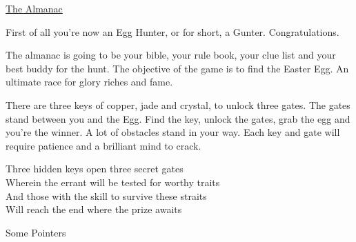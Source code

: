 \documentclass[a4paper]{article}
\newcommand{\row}{\vspace{5mm}}
\begin{document}
\begin{center}
\Large{\underline{The Almanac}}
\end{center}

\newenvironment{noSepEnumerate}
{ \begin{enumerate}
    \setlength{\itemsep}{1pt}
    \setlength{\parskip}{0pt}
    \setlength{\parsep}{0pt}}
{ \end{enumerate}}
First of all you're now an Egg Hunter, or for short, a Gunter. Congratulations.

\row
The almanac is going to be your bible, your rule book, your clue list and your best buddy for the hunt. The objective of the game is to find the Easter Egg. An ultimate race for glory riches and fame.

There are three keys of copper, jade and crystal, to unlock three gates. The gates stand between you and the Egg. Find the key, unlock the gates, grab the egg and you're the winner. A lot of obstacles stand in your way. Each key and gate will require patience and a brilliant mind to crack.

\row
\begin{centering}
Three hidden keys open three secret gates \\
Wherein the errant will be tested for worthy traits \\
And those with the skill to survive these straits \\
Will reach the end where the prize awaits \\
\end{centering}  

\row
\begin{flushleft}
Some Pointers
\end{flushleft}
\end{document}
